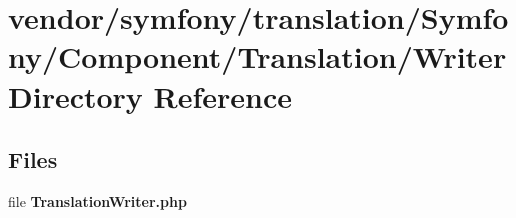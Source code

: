 \section{vendor/symfony/translation/\+Symfony/\+Component/\+Translation/\+Writer Directory Reference}
\label{dir_4d2da41a3aedefad494b7ca786ebfb15}
\subsection*{Files}
\begin{DoxyCompactItemize}
\item 
file {\bf Translation\+Writer.\+php}
\end{DoxyCompactItemize}
